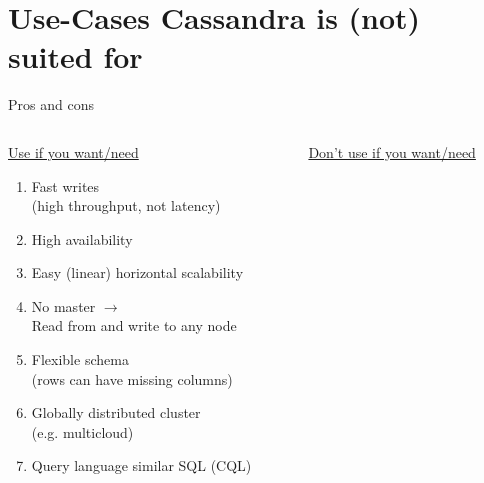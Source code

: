 \documentclass[
  10pt
]{beamer}
\begin{document}
\section{Use-Cases Cassandra is (not) suited for}  %
\begin{frame}{Pros and cons \cite{ProsAndCons}}
  \begin{columns}[T]
    \begin{column}{0.55\textwidth}
      \underline{Use if you want/need}

      \begin{enumerate}[\textbf{\textcolor{aswe-data}{+}}]
        \item<2-> Fast writes \\ (high throughput, not latency)
        \item<3-> High availability
        \item<4-> Easy (linear) horizontal scalability
        \item<5-> No master $\rightarrow$ \\ Read from and write to any node
        \item<6-> Flexible schema \\ (rows can have missing columns)
        \item<7-> Globally distributed cluster \\ (e.g. multicloud)
        \item<8-> Query language similar SQL (CQL)
      \end{enumerate}
    \end{column}

    \begin{column}{0.45\textwidth}
      \underline{Don't use if you want/need}


\end{column}
\end{columns}
\end{frame}
\end{document}
